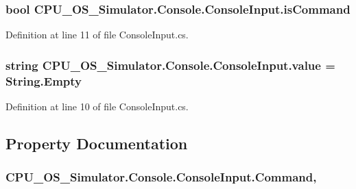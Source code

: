 \subsubsection[{is\+Command}]{\setlength{\rightskip}{0pt plus 5cm}bool C\+P\+U\+\_\+\+O\+S\+\_\+\+Simulator.\+Console.\+Console\+Input.\+is\+Command\hspace{0.3cm}{\ttfamily [private]}}\label{class_c_p_u___o_s___simulator_1_1_console_1_1_console_input_a56609a7b8e3d6bda9e166198e3a176c0}


Definition at line 11 of file Console\+Input.\+cs.

\hypertarget{class_c_p_u___o_s___simulator_1_1_console_1_1_console_input_a859295836e526e9b8b5e3da265caa177}{}
\subsubsection[{value}]{\setlength{\rightskip}{0pt plus 5cm}string C\+P\+U\+\_\+\+O\+S\+\_\+\+Simulator.\+Console.\+Console\+Input.\+value = String.\+Empty\hspace{0.3cm}{\ttfamily [private]}}\label{class_c_p_u___o_s___simulator_1_1_console_1_1_console_input_a859295836e526e9b8b5e3da265caa177}


Definition at line 10 of file Console\+Input.\+cs.



\subsection{Property Documentation}
\hypertarget{class_c_p_u___o_s___simulator_1_1_console_1_1_console_input_a86a4918cd4a894e9af4fd6a5eced98ea}{}
\subsubsection[{Command}]{ C\+P\+U\+\_\+\+O\+S\+\_\+\+Simulator.\+Console.\+Console\+Input.\+Command\hspace{0.3cm}{\ttfamily [get]}, {\ttfamily [set]}}\label{class_c_p_u___o_s___simulator_1_1_console_1_1_console_input_a86a4918cd4a894e9af4fd6a5eced98ea}


